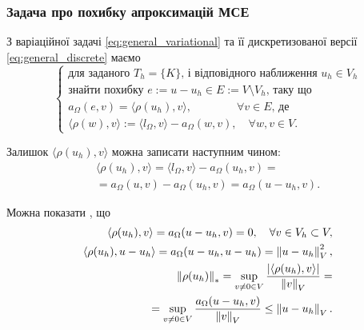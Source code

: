 
\begin{frame}[allowframebreaks]
	\frametitle<presentation>{Задача про похибку апроксимацій МСЕ}

		З варіаційної задачі \eqref{eq:general_variational} та її дискретизованої версії
		\eqref{eq:general_discrete} маємо
		\begin{equation}\label{eq:AE_problem}
			\begin{cases}
				\mbox{для заданого } T_h=\{K\} \text{, і відповідного наближення } u_h \in V_h \\
				\text{знайти похибку } e:=u-u_h \in E := V \setminus V_h \text{, таку що} \\
				a_\Omega(e,v) = \langle\rho(u_h), v\rangle, \qquad \qquad \forall v \in E \text{, де}\\
				\langle\rho(w), v\rangle := \langle l_\Omega, v\rangle - a_\Omega(w, v), \quad \forall w,v \in V.
			\end{cases}
		\end{equation}

	\framebreak

		Залишок $\langle\rho(u_h), v\rangle$ можна записати наступним чином:
		\begin{equation*}
			\begin{split}
				\langle\rho(u_h), v\rangle
					= \langle l_\Omega, v\rangle - a_\Omega(u_h, v) = \\
					= a_\Omega(u,v)-a_\Omega(u_h, v) = a_\Omega(u-u_h, v).
			\end{split}
		\end{equation*}

		Можна показати , що
		\begin{equation*}\label{eq:residual_properties}
			\begin{split}
				\langle\rho(u_h), v\rangle = a_\Omega(u-u_h, v) = 0, \quad \forall v \in V_h \subset V,\\
				\langle\rho(u_h), u-u_h\rangle = a_\Omega(u-u_h, u-u_h) = \left\lVert u-u_h\right\rVert^2_V,\\
				\left\lVert\rho(u_h)\right\rVert_* = \sup \limits_{v \ne 0 \in V} \frac{|\langle\rho(u_h), v\rangle|}{\left\lVert v\right\rVert_V} = \\
					 = \sup \limits_{v \ne 0 \in V} \frac{a_\Omega(u-u_h, v)}{\left\lVert v\right\rVert_V} \le \left\lVert u-u_h\right\rVert_V .
			\end{split}
		\end{equation*}
\end{frame}
